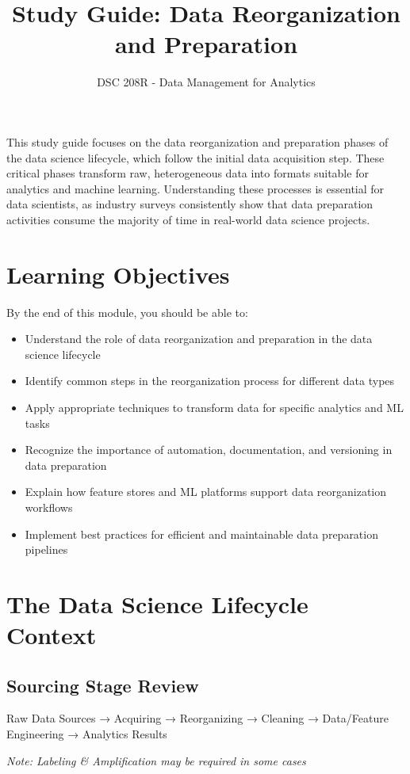\documentclass[12pt]{article}
\title{Study Guide: Data Reorganization and Preparation}
\author{DSC 208R - Data Management for Analytics}
\date{}
\begin{document}
\maketitle

\begin{tcolorbox}[colback=blue!5!white,colframe=blue!75!black,title={Overview}]
This study guide focuses on the data reorganization and preparation phases of the data science lifecycle, which follow the initial data acquisition step. These critical phases transform raw, heterogeneous data into formats suitable for analytics and machine learning. Understanding these processes is essential for data scientists, as industry surveys consistently show that data preparation activities consume the majority of time in real-world data science projects.
\end{tcolorbox}

\section{Learning Objectives}

By the end of this module, you should be able to:

\begin{itemize}
    \item Understand the role of data reorganization and preparation in the data science lifecycle
    \item Identify common steps in the reorganization process for different data types
    \item Apply appropriate techniques to transform data for specific analytics and ML tasks
    \item Recognize the importance of automation, documentation, and versioning in data preparation
    \item Explain how feature stores and ML platforms support data reorganization workflows
    \item Implement best practices for efficient and maintainable data preparation pipelines
\end{itemize}

\section{The Data Science Lifecycle Context}

\subsection{Sourcing Stage Review}
\begin{tcolorbox}[colback=green!5!white,colframe=green!75!black,title={Sourcing Process Flow}]
Raw Data Sources → Acquiring → Reorganizing → Cleaning → Data/Feature Engineering → Analytics Results

\textit{Note: Labeling \& Amplification may be required in some cases}
\end{tcolorbox}
\end{document}
